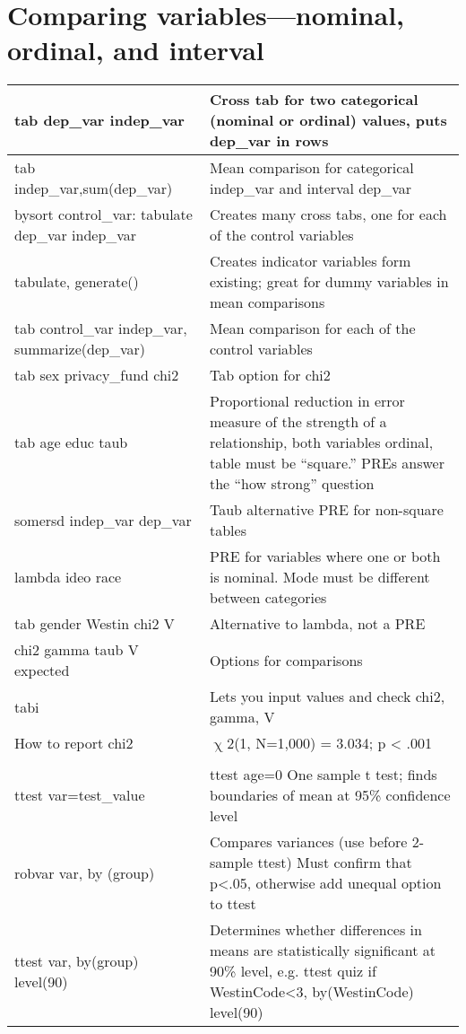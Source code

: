 \documentclass{article}
\begin{document}
\section{Comparing variables---nominal, ordinal, and interval}
\centering
\begin{tabularx}{\linewidth}{ X X }
\hline
tab dep\_var indep\_var & Cross tab for two categorical (nominal or ordinal) values, puts dep\_var in rows \\\hline 
tab indep\_var,sum(dep\_var) & Mean comparison for categorical indep\_var and interval dep\_var \\\hline 
bysort control\_var: tabulate dep\_var indep\_var & Creates many cross tabs, one for each of the control variables \\\hline 
tabulate, generate() & Creates indicator variables form existing; great for dummy variables in mean comparisons  \\\hline 
tab control\_var indep\_var, summarize(dep\_var) & Mean comparison for each of the control variables \\\hline 
tab sex privacy\_fund chi2 & Tab option for chi2 \\\hline 
tab age educ taub & Proportional reduction in error measure of the strength of a relationship, both variables ordinal, table must be “square.”  PREs answer the “how strong” question \\\hline 
somersd indep\_var dep\_var & Taub alternative PRE for non-square tables \\\hline 
lambda ideo race & PRE for variables where one or both is nominal.  Mode must be different between categories \\\hline 
tab gender Westin chi2 V & Alternative to lambda, not a PRE \\\hline 
chi2 gamma taub V expected & Options for comparisons \\\hline 
tabi & Lets you input values and check chi2, gamma, V \\\hline 
How to report chi2 & ${\upchi}$2(1, N=1,000) = 3.034; p {\textless} .001 \\\hline 
 &  \\\hline 
ttest var=test\_value & ttest age=0 One sample t test; finds boundaries of mean at 95\% confidence level \\\hline 
robvar var, by (group)  & Compares variances (use before 2-sample ttest) Must confirm that p{\textless}.05, otherwise add unequal option to ttest \\\hline 
ttest var, by(group) level(90) & Determines whether differences in means are statistically significant at 90\% level, e.g. ttest quiz if WestinCode{\textless}3, by(WestinCode) level(90) \\\hline 

\end{tabularx}
\end{document}
